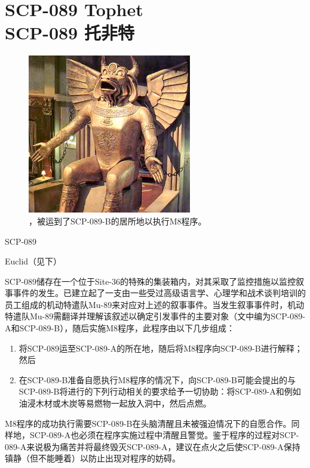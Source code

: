 \chapter[SCP-089 托非特]{
    SCP-089 Tophet\\
    SCP-089 托非特
}

\label{chap:SCP-089}

\begin{figure}[H]
    \centering
    \includegraphics[width=0.5\linewidth]{images/SCP-089.jpg}
    \caption*{，被运到了SCP-089-B的居所地以执行M8程序。}
\end{figure}

SCP-089

Euclid（见下）

SCP-089储存在一个位于Site-36的特殊的集装箱内，对其采取了监控措施以监控叙事事件的发生。已建立起了一支由一些受过高级语言学、心理学和战术谈判培训的员工组成的机动特遣队Mu-89来对应对上述的叙事事件。当发生叙事事件时，机动特遣队Mu-89需翻译并理解该叙述以确定引发事件的主要对象（文中编为SCP-089-A和SCP-089-B），随后实施M8程序，此程序由以下几步组成：

\begin{enumerate}
\item 将SCP-089运至SCP-089-A的所在地，随后将M8程序向SCP-089-B进行解释；然后
\item 在SCP-089-B准备自愿执行M8程序的情况下，向SCP-089-B可能会提出的与SCP-089-B将进行的下列行动相关的要求给予一切协助：将SCP-089-A和例如油浸木材或木炭等易燃物一起放入洞中，然后点燃。
\end{enumerate}

M8程序的成功执行需要SCP-089-B在头脑清醒且未被强迫情况下的自愿合作。同样地，SCP-089-A也必须在程序实施过程中清醒且警觉。鉴于程序的过程对SCP-089-A来说极为痛苦并将最终毁灭SCP-089-A，建议在点火之后使SCP-089-A保持镇静（但不能睡着）以防止出现对程序的妨碍。

